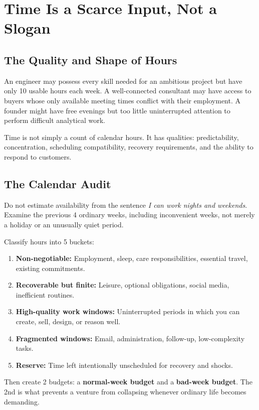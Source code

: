 \section{Time Is a Scarce Input, Not a Slogan}

\subsection{The Quality and Shape of Hours}

An engineer may possess every skill needed for an ambitious project but have only 10 usable hours each week. A well-connected consultant may have access to buyers whose only available meeting times conflict with their employment. A founder might have free evenings but too little uninterrupted attention to perform difficult analytical work.

Time is not simply a count of calendar hours. It has qualities: predictability, concentration, scheduling compatibility, recovery requirements, and the ability to respond to customers.

\subsection{The Calendar Audit}

Do not estimate availability from the sentence \textit{I can work nights and weekends}. Examine the previous 4 ordinary weeks, including inconvenient weeks, not merely a holiday or an unusually quiet period.

Classify hours into 5 buckets:
\begin{enumerate}[label=\textbf{\arabic*.},leftmargin=11pt,itemsep=1.5pt,topsep=1.5pt,parsep=0pt]
  \item \textbf{Non-negotiable:} Employment, sleep, care responsibilities, essential travel, existing commitments.
  \item \textbf{Recoverable but finite:} Leisure, optional obligations, social media, inefficient routines.
  \item \textbf{High-quality work windows:} Uninterrupted periods in which you can create, sell, design, or reason well.
  \item \textbf{Fragmented windows:} Email, administration, follow-up, low-complexity tasks.
  \item \textbf{Reserve:} Time left intentionally unscheduled for recovery and shocks.
\end{enumerate}

Then create 2 budgets: a \textbf{normal-week budget} and a \textbf{bad-week budget}. The 2nd is what prevents a venture from collapsing whenever ordinary life becomes demanding.


